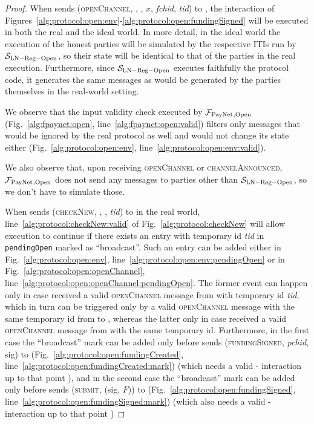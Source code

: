   \begin{proof}
    When \environment{} sends (\textsc{openChannel}, \alice, \bob, $x$,
    \textit{fchid}, \textit{tid}) to \alice, the interaction of
    Figures~\ref{alg:protocol:open:env}-\ref{alg:protocol:open:fundingSigned}
    will be executed in both the real and the ideal world. In more detail, in
    the ideal world the execution of the honest parties will be simulated by the
    respective ITIs run by $\mathcal{S}_{\mathrm{LN - Reg - Open}}$, so their
    state will be identical to that of the parties in the real execution.
    Furthermore, since $\mathcal{S}_{\mathrm{LN - Reg - Open}}$ executes
    faithfully the protocol code, it generates the same messages as would be
    generated by the parties themselves in the real-world setting.

    We observe that the input validity check executed by $\mathcal{F}_{\mathrm{PayNet}}{}_{\mathrm{,
    Open}}$ (Fig.~\ref{alg:fpaynet:open}, line~\ref{alg:fpaynet:open:valid})
    filters only messages that would be ignored by the real protocol as well and
    would not change its state either (Fig.~\ref{alg:protocol:open:env},
    line~\ref{alg:protocol:open:env:valid}).

    We also observe that, upon receiving \textsc{openChannel} or
    \textsc{channelAnnounced}, $\mathcal{F}_{\mathrm{PayNet}}{}_{\mathrm{, Open}}$ does not send any
    messages to parties other than $\mathcal{S}_{\mathrm{LN - Reg - Open}}$, so
    we don't have to simulate those.

    When \environment{} sends (\textsc{checkNew}, \alice, \bob, \textit{tid}) to
    \alice{} in the real world, line~\ref{alg:protocol:checkNew:valid} of
    Fig.~\ref{alg:protocol:checkNew} will allow execution to continue if there
    exists an entry with temporary id \textit{tid} in \texttt{pendingOpen}
    marked as ``broadcast''. Such an entry can be added either in
    Fig.~\ref{alg:protocol:open:env},
    line~\ref{alg:protocol:open:env:pendingOpen} or in
    Fig.~\ref{alg:protocol:open:openChannel},
    line~\ref{alg:protocol:open:openChannel:pendingOpen}. The former event can
    happen only in case \alice{} received a valid \textsc{openChannel} message
    from \bob{} with temporary id \textit{tid}, which in turn can be triggered
    only by a valid \textsc{openChannel} message with the same temporary id from
    \environment{} to \bob{}, whereas the latter only in case \alice{} received
    a valid \textsc{openChannel} message from \environment{} with the same
    temporary id. Furthermore, in the first case the ``broadcast'' mark can be
    added only before \alice{} sends (\textsc{fundingSigned}, \textit{pchid},
    sig) to \bob{} (Fig.~\ref{alg:protocol:open:fundingCreated},
    line~\ref{alg:protocol:open:fundingCreated:mark}) (which needs a valid
    \alice-\bob{} interaction up to that point ), and in
    the second case the ``broadcast'' mark can be added only before \alice{}
    sends (\textsc{submit}, (sig, $F$)) to \ledger{}
    (Fig.~\ref{alg:protocol:open:fundingSigned},
    line~\ref{alg:protocol:open:fundingSigned:mark}) (which also needs a valid
    \alice-\bob{} interaction up to that point )


\end{proof}
